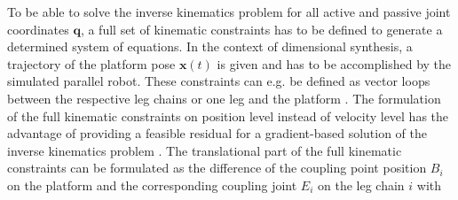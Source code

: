 \documentclass[fleqn,a4paper,10pt]{article}
\newcommand{\bm}[1]{\mathbf{#1}}
\renewcommand{\Phi}[1]{\varPhi{#1}}
\begin{document}
\begin{multicols}{2}

To be able to solve the inverse kinematics problem for all active and passive joint coordinates $\bm{q}$, a full set of kinematic constraints has to be defined to generate a determined system of equations.
In the context of dimensional synthesis, a trajectory of the platform pose $\bm{x}(t)$ is given and has to be accomplished by the simulated parallel robot.
These constraints can e.g. be defined as vector loops between the respective leg chains \cite{Gogu2008} or one leg and the platform \cite{Merlet2006}.
The formulation of the full kinematic constraints on position level instead of velocity level has the advantage of providing a feasible residual for a gradient-based solution of the inverse kinematics problem \cite{SchapplerTapOrt2019c}. %
%
The translational part of the full kinematic constraints can be formulated as the difference of the coupling point position $B_i$ on the platform and the corresponding coupling joint $E_i$ on the leg chain $i$ with



\end{multicols}
\end{document}
